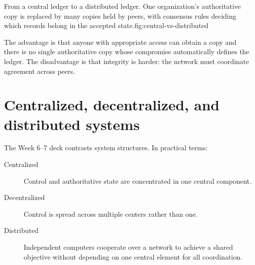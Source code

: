 \begin{utpfig}{From a central ledger to a distributed ledger. One organization's authoritative copy is replaced by many copies held by peers, with consensus rules deciding which records belong in the accepted state.}{fig:central-vs-distributed}
\end{utpfig}

The advantage is that anyone with appropriate access can obtain a copy and there is no single authoritative copy whose compromise automatically defines the ledger. The disadvantage is that integrity is harder: the network must coordinate agreement across peers.

\section{Centralized, decentralized, and distributed systems}

The Week 6--7 deck contrasts system structures. In practical terms:

\begin{description}
  \item[Centralized] Control and authoritative state are concentrated in one central component.
  \item[Decentralized] Control is spread across multiple centers rather than one.
  \item[Distributed] Independent computers cooperate over a network to achieve a shared objective without depending on one central element for all coordination.
\end{description}

